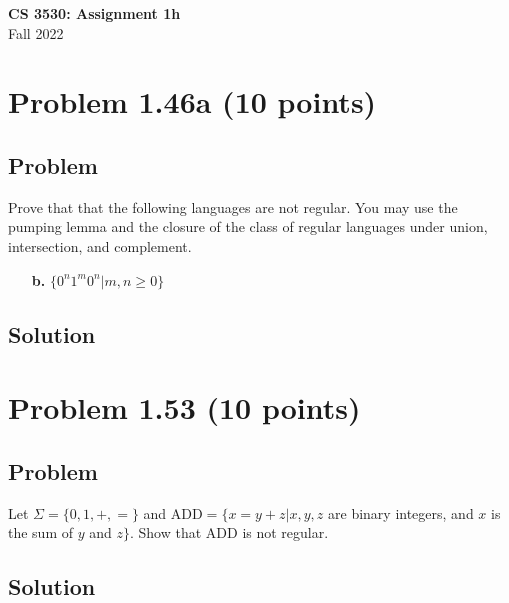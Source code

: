 \documentclass{article}
\begin{document}
\begin{empfile}

\begin{center}
\textbf{\Large CS 3530: Assignment 1h} \\[2mm]
Fall 2022
\end{center}

\raggedright

\section*{Problem 1.46a (10 points)}

\subsection*{Problem}

Prove that that the following languages are not regular.
You may use the pumping lemma and the closure of the
class of regular languages under union, intersection, and complement.

\begin{enumerate}
\item[\bfseries b.] $\{0^n1^m0^n | m,n \ge 0\}$
\end{enumerate}

\subsection*{Solution}


\section*{Problem 1.53 (10 points)}

\subsection*{Problem}

Let $\Sigma = \{0,1,+,=\}$ and \textsc{ADD}$ = \{ x=y+z| x,y,z $ are binary integers, and $x$ is the sum of $y$ and $z \}$.  Show that \textsc{ADD} is not regular.

\subsection*{Solution}

\end{empfile}
\immediate{}
\end{document}
